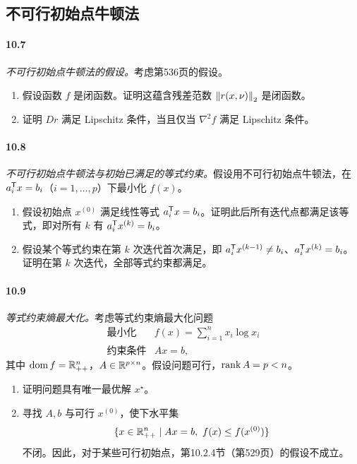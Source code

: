\subsection*{不可行初始点牛顿法}
\paragraph{10.7} \emph{不可行初始点牛顿法的假设。}考虑第536页的假设。
\begin{enumerate}[label=(\alph*)]
\item 假设函数 $f$ 是闭函数。证明这蕴含残差范数 $\left\lVert r(x,\nu)\right\rVert_2$ 是闭函数。
\item 证明 $Dr$ 满足 Lipschitz 条件，当且仅当 $\nabla^2f$ 满足 Lipschitz 条件。
\end{enumerate}

\paragraph{10.8} \emph{不可行初始点牛顿法与初始已满足的等式约束。}假设用不可行初始点牛顿法，在 $a_i^\mathsf T x=b_i$（$i=1,\ldots,p$）下最小化 $f(x)$。
\begin{enumerate}[label=(\alph*)]
\item 假设初始点 $x^{(0)}$ 满足线性等式 $a_i^\mathsf T x=b_i$。证明此后所有迭代点都满足该等式，即对所有 $k$ 有 $a_i^\mathsf T x^{(k)}=b_i$。
\item 假设某个等式约束在第 $k$ 次迭代首次满足，即 $a_i^\mathsf T x^{(k-1)}\ne b_i$、$a_i^\mathsf T x^{(k)}=b_i$。证明在第 $k$ 次迭代，全部等式约束都满足。
\end{enumerate}

\paragraph{10.9} \emph{等式约束熵最大化。}考虑等式约束熵最大化问题
\begin{equation}\begin{array}{ll}\text{最小化}&f(x)=\displaystyle\sum_{i=1}^n x_i\log x_i\\\text{约束条件}&Ax=b,\end{array}\tag{10.42}\end{equation}
其中 $\operatorname{dom} f=\mathbb R_{++}^n$，$A\in\mathbb R^{p\times n}$。假设问题可行，$\operatorname{rank} A=p<n$。
\begin{enumerate}[label=(\alph*)]
\item 证明问题具有唯一最优解 $x^\star$。
\item 寻找 $A,b$ 与可行 $x^{(0)}$，使下水平集
\[\{x\in\mathbb R_{++}^n\mid Ax=b,\ f(x)\le f(x^{(0)})\}\]
不闭。因此，对于某些可行初始点，第10.2.4节（第529页）的假设不成立。
\end{enumerate}

